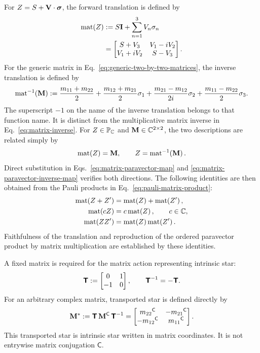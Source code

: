 For \(Z=S+\mathbf{V}\cdot\mathbf{\bm{\sigma}}\), the forward translation is defined by
\begin{align}
\operatorname{mat}\!\left(Z\right)
&:=S\mathbf{I}+\sum_{n=1}^{3}V_n\mathbf{\sigma}_n\notag\\
&=
\begin{bmatrix}
S+V_3&V_1-iV_2\\
V_1+iV_2&S-V_3
\end{bmatrix}.
\label{eq:matrix-paravector-map}
\end{align}
For the generic matrix in Eq.\ \eqref{eq:generic-two-by-two-matrices}, the
inverse translation is defined by
\begin{equation}
\operatorname{mat}^{-1}\!\left(\mathbf{M}\right)
:=
\frac{m_{11}+m_{22}}{2}
+\frac{m_{12}+m_{21}}{2}\sigma_1
+\frac{m_{21}-m_{12}}{2i}\sigma_2
+\frac{m_{11}-m_{22}}{2}\sigma_3.
\label{eq:matrix-paravector-inverse-map}
\end{equation}
The superscript \(-1\) on the name of the inverse translation belongs to
that function name. It is distinct from the multiplicative matrix inverse
in Eq.\ \eqref{eq:matrix-inverse}. For
\(Z\in\mathbb{P}_{\mathbb{C}}\) and \(\mathbf{M}\in\mathbb{C}^{2\times2}\), the two descriptions
are related simply by
\begin{equation}
\operatorname{mat}\!\left(Z\right)=\mathbf{M},
\qquad
Z=\operatorname{mat}^{-1}\!\left(\mathbf{M}\right).
\label{eq:matrix-map-inverses}
\end{equation}
Direct substitution in Eqs.\ \eqref{eq:matrix-paravector-map} and
\eqref{eq:matrix-paravector-inverse-map} verifies both directions.
The following identities are then obtained from the Pauli products in
Eq.\ \eqref{eq:pauli-matrix-product}:
\begin{equation}
\begin{aligned}
\matf{\pv{Z}+\pv{Z}'}
&=\matf{\pv{Z}}+\matf{\pv{Z}'},\\
\matf{c\pv{Z}}
&=c\matf{\pv{Z}},
\qquad c\in\C,\\
\matf{\pv{Z}\pv{Z}'}
&=\matf{\pv{Z}}\matf{\pv{Z}'}.
\end{aligned}
\label{eq:matrix-product-preservation}
\end{equation}
Faithfulness of the translation and reproduction of the ordered paravector
product by matrix multiplication are established by these identities.

A fixed matrix is required for the matrix action representing intrinsic
star:
\begin{equation}
\mathbf{\bm{\mathsf T}}
:=
\begin{bmatrix}
0&1\\
-1&0
\end{bmatrix},
\qquad
\mathbf{\bm{\mathsf T}}^{-1}=-\mathbf{\bm{\mathsf T}}.
\label{eq:matrix-T}
\end{equation}
For an arbitrary complex matrix, transported star is defined directly by
\begin{equation}
\mathbf{M}^{*}
:=\mathbf{\bm{\mathsf T}}\,{\mathbf{M}}^{\mathsf C}\,\mathbf{\bm{\mathsf T}}^{-1}
=
\begin{bmatrix}
{m_{22}}^{\mathsf C}&-{m_{21}}^{\mathsf C}\\
-{m_{12}}^{\mathsf C}&{m_{11}}^{\mathsf C}
\end{bmatrix}.
\label{eq:matrix-star}
\end{equation}
This transported star is intrinsic star written in matrix coordinates. It
is not entrywise matrix conjugation \(\mathsf C\).

